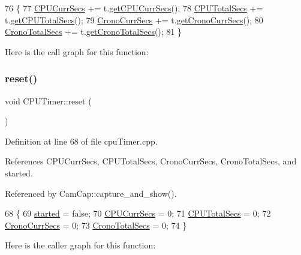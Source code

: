 \begin{DoxyCode}
76                                       \{
77     \hyperlink{class_c_p_u_timer_aa34930f260364d48351fac6f5b926c82}{CPUCurrSecs} += t.\hyperlink{class_c_p_u_timer_a98f96656fd5e6676064ac6e5f3c7621b}{getCPUCurrSecs}();
78     \hyperlink{class_c_p_u_timer_a1f61a2313ec71eb67d658c482420abe7}{CPUTotalSecs} += t.\hyperlink{class_c_p_u_timer_a9547512dbcec01ea685d291569a87aa4}{getCPUTotalSecs}();
79     \hyperlink{class_c_p_u_timer_a5cd38d0e4893710f1c85f1aa03961cbc}{CronoCurrSecs} += t.\hyperlink{class_c_p_u_timer_a363d9ba80f897fe24914cce080bf3b52}{getCronoCurrSecs}();
80     \hyperlink{class_c_p_u_timer_a9c8ac2ee9f44e8b4365321698cf17493}{CronoTotalSecs} += t.\hyperlink{class_c_p_u_timer_aa8736023dbfa50166f8e49960ad84a84}{getCronoTotalSecs}();
81 \}
\end{DoxyCode}
Here is the call graph for this function\+:
\mbox{\label{class_c_p_u_timer_ae9c1b873923f73091dae7e5a6051baf6}} 
\subsubsection{\texorpdfstring{reset()}{reset()}}
{\footnotesize\ttfamily void C\+P\+U\+Timer\+::reset (\begin{DoxyParamCaption}{ }\end{DoxyParamCaption})}



Definition at line 68 of file cpu\+Timer.\+cpp.



References C\+P\+U\+Curr\+Secs, C\+P\+U\+Total\+Secs, Crono\+Curr\+Secs, Crono\+Total\+Secs, and started.



Referenced by Cam\+Cap\+::capture\+\_\+and\+\_\+show().


\begin{DoxyCode}
68                      \{
69     \hyperlink{class_c_p_u_timer_a8fde2f68dd2f4811400429dcf9a4a6c7}{started} = \textcolor{keyword}{false};
70     \hyperlink{class_c_p_u_timer_aa34930f260364d48351fac6f5b926c82}{CPUCurrSecs} = 0;
71     \hyperlink{class_c_p_u_timer_a1f61a2313ec71eb67d658c482420abe7}{CPUTotalSecs} = 0;
72     \hyperlink{class_c_p_u_timer_a5cd38d0e4893710f1c85f1aa03961cbc}{CronoCurrSecs} = 0;
73     \hyperlink{class_c_p_u_timer_a9c8ac2ee9f44e8b4365321698cf17493}{CronoTotalSecs} = 0;
74 \}
\end{DoxyCode}
Here is the caller graph for this function\+:
\mbox{\label{class_c_p_u_timer_a8712b4f64c79a210e91bbb72ed55bfc1}} 
